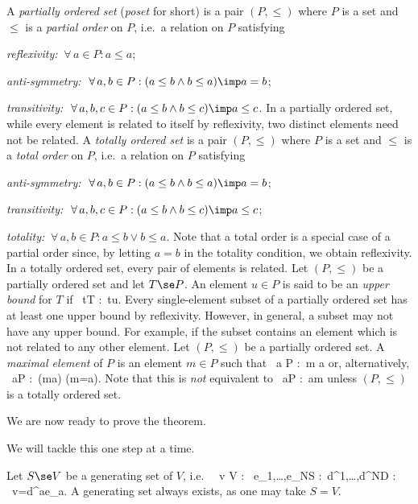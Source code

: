 \bd
A \emph{partially ordered set} (\emph{poset} for short) is a pair $(P,\leq)$ where $P$ is a set and~$\leq$ is a \emph{partial order} on $P$, i.e.\ a relation on $P$ satisfying
\ben[label=\roman*)]
\item \emph{reflexivity:} $\ \forall \, a \in P: a\leq a$;
\item \emph{anti-symmetry:} $\ \forall \, a,b\in P : ( a\leq b \land b\leq a) \imp a=b$;
\item \emph{transitivity:} $\ \forall \, a,b,c\in P:(a\leq b \land b\leq c)\imp a\leq c$.
\een
\ed
In a partially ordered set, while every element is related to itself by reflexivity, two distinct elements need not be related.
\bd
A \emph{totally ordered set} is a pair $(P,\leq)$ where $P$ is a set and $\leq$ is a \emph{total order} on $P$, i.e.\ a relation on $P$ satisfying
\ben[label=\alph*)]
\item \emph{anti-symmetry:} $\ \forall \, a,b\in P : ( a\leq b \land b\leq a) \imp a=b$;
\item \emph{transitivity:} $\ \forall \, a,b,c\in P:(a\leq b \land b\leq c)\imp a\leq c$;
\item \emph{totality:} $\ \forall \, a,b \in P: a\leq b\lor b\leq a$.
\een
\ed
Note that a total order is a special case of a partial order since, by letting $a=b$ in the totality condition, we obtain reflexivity. In a totally ordered set, every pair of elements is related. 
\bd
Let $(P,\leq)$ be a partially ordered set and let $T\se P$. An element $u\in P$ is said to be an \emph{upper bound} for $T$ if
\bse
\forall \, t\in T :\ t\leq u.
\ese
\ed
Every single-element subset of a partially ordered set has at least one upper bound by reflexivity. However, in general, a subset may not have any upper bound. For example, if the subset contains an element which is not related to any other element.
\bd
Let $(P,\leq)$ be a partially ordered set. A \emph{maximal element} of $P$ is an element $m\in P$ such that
\bse
\nexists \, a \in P :\ m \leq a
\ese
or, alternatively,
\bse
\forall \, a\in P :\ (m\leq a) \imp (m=a).
\ese
Note that this is \emph{not} equivalent to 
\bse
\forall \, a\in P :\ a\leq m
\ese
unless $(P,\leq)$ is a totally ordered set.
\ed

We are now ready to prove the theorem.

 We will tackle this one step at a time.
\ben[label=\alph*)]

\item Let $S\se V$ be a generating set of $V$, i.e.\
\bse
\forall \, v \in V : \exists \, e_1,\ldots,e_N\in S : \exists \,d^1,\ldots,d^N\in D : \ v=d^ae_a. 
\ese
A generating set always exists, as one may take $S=V$.

